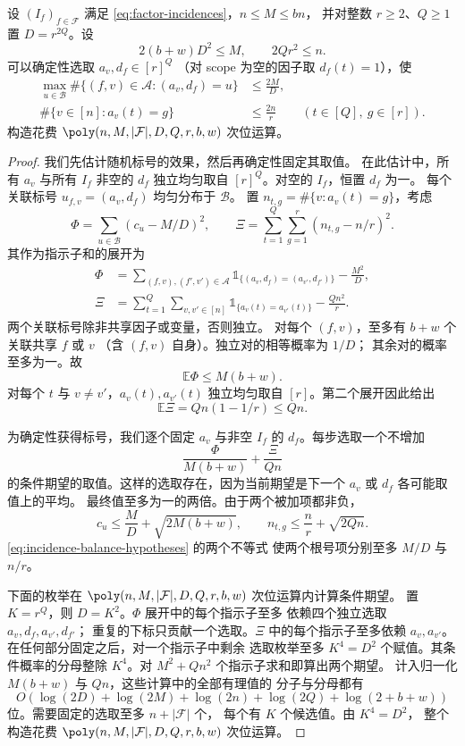 \begin{lemma}\label{lem:incidence-labels}
设 $(I_f)_{f\in\mathcal F}$ 满足
\eqref{eq:factor-incidences}，$n\le M\le bn$，
并对整数 $r\ge2$、$Q\ge1$ 置 $D=r^{2Q}$。设
\begin{equation}\label{eq:incidence-balance-hypotheses}
 2(b+w)D^2\le M,\qquad 2Qr^2\le n.
\end{equation}
可以确定性选取 $a_v,d_f\in[r]^Q$
（对 scope 为空的因子取 $d_f(t)=1$），使
\[
 \begin{aligned}
 \max_{u\in\mathcal B}\#\{(f,v)\in\mathcal A:(a_v,d_f)=u\}
 &\le\frac{2M}{D},\\
 \#\{v\in[n]:a_v(t)=g\}&\le\frac{2n}{r}
 \qquad(t\in[Q],\ g\in[r]).
 \end{aligned}
\]
构造花费 $\poly(n,M,|\mathcal F|,D,Q,r,b,w)$ 次位运算。
\end{lemma}
\begin{proof}
我们先估计随机标号的效果，然后再确定性固定其取值。
在此估计中，所有 $a_v$ 与所有 $I_f$ 非空的 $d_f$
独立均匀取自 $[r]^Q$。对空的 $I_f$，恒置 $d_f$ 为一。
每个关联标号 $u_{f,v}=(a_v,d_f)$ 均匀分布于 $\mathcal B$。
置 $n_{t,g}=\#\{v:a_v(t)=g\}$，考虑
\[
 \Phi=\sum_{u\in\mathcal B}(c_u-M/D)^2,
 \qquad
 \Xi=\sum_{t=1}^Q\sum_{g=1}^r(n_{t,g}-n/r)^2.
\]
其作为指示子和的展开为
\[
 \begin{aligned}
 \Phi&=\sum_{(f,v),(f',v')\in\mathcal A}
       \mathds{1}_{\{(a_v,d_f)=(a_{v'},d_{f'})\}}-\frac{M^2}{D},\\
 \Xi&=\sum_{t=1}^Q\sum_{v,v'\in[n]}
       \mathds{1}_{\{a_v(t)=a_{v'}(t)\}}-\frac{Qn^2}{r}.
 \end{aligned}
\]
两个关联标号除非共享因子或变量，否则独立。
对每个 $(f,v)$，至多有 $b+w$ 个关联共享 $f$ 或 $v$
（含 $(f,v)$ 自身）。独立对的相等概率为 $1/D$；
其余对的概率至多为一。故
\[
 \mathbb E\Phi\le M(b+w).
\]
对每个 $t$ 与 $v\ne v'$，$a_v(t),a_{v'}(t)$
独立均匀取自 $[r]$。第二个展开因此给出
\[
 \mathbb E\Xi=Qn(1-1/r)\le Qn.
\]

为确定性获得标号，我们逐个固定 $a_v$ 与非空 $I_f$
的 $d_f$。每步选取一个不增加
\[
 \frac{\Phi}{M(b+w)}+\frac{\Xi}{Qn}
\]
的条件期望的取值。这样的选取存在，因为当前期望是下一个
$a_v$ 或 $d_f$ 各可能取值上的平均。
最终值至多为一的两倍。由于两个被加项都非负，
\[
 c_u\le\frac MD+\sqrt{2M(b+w)},\qquad
 n_{t,g}\le\frac nr+\sqrt{2Qn}.
\]
\eqref{eq:incidence-balance-hypotheses} 的两个不等式
使两个根号项分别至多 $M/D$ 与 $n/r$。

下面的枚举在 $\poly(n,M,|\mathcal F|,D,Q,r,b,w)$
次位运算内计算条件期望。
置 $K=r^Q$，则 $D=K^2$。$\Phi$ 展开中的每个指示子至多
依赖四个独立选取 $a_v,d_f,a_{v'},d_{f'}$；
重复的下标只贡献一个选取。$\Xi$ 中的每个指示子至多依赖
$a_v,a_{v'}$。在任何部分固定之后，对一个指示子中剩余
选取枚举至多 $K^4=D^2$ 个赋值。其条件概率的分母整除
$K^4$。对 $M^2+Qn^2$ 个指示子求和即算出两个期望。
计入归一化 $M(b+w)$ 与 $Qn$，这些计算中的全部有理值的
分子与分母都有
\[
 O\!\left(\log(2D)+\log(2M)+\log(2n)+\log(2Q)+\log(2+b+w)\right)
\]
位。需要固定的选取至多 $n+|\mathcal F|$ 个，
每个有 $K$ 个候选值。由 $K^4=D^2$，
整个构造花费 $\poly(n,M,|\mathcal F|,D,Q,r,b,w)$
次位运算。
\end{proof}

